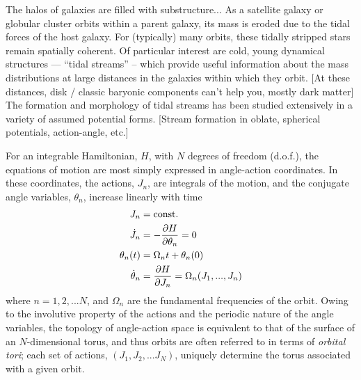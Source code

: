 \documentclass[letterpaper,12pt,preprint]{aastex}
\begin{document}
The halos of galaxies are filled with substructure...
As a satellite galaxy or globular cluster orbits within a parent galaxy, its mass is eroded due to the tidal forces of the host galaxy. For (typically) many orbits, these tidally stripped stars remain spatially coherent.
Of particular interest are cold, young dynamical structures --- ``tidal streams'' -- which provide useful information about the mass distributions at large distances in the galaxies within which they orbit. [At these distances, disk / classic baryonic components can't help you, mostly dark matter]
The formation and morphology of tidal streams has been studied extensively in a variety of assumed potential forms. [Stream formation in oblate, spherical potentials, action-angle, etc.]

For an integrable Hamiltonian, $H$, with $N$ degrees of freedom (d.o.f.), the equations of motion are most simply expressed in angle-action coordinates. In these coordinates, the actions, $J_n$, are integrals of the motion, and the conjugate angle variables, $\theta_n$, increase linearly with time
\begin{align}
	J_n &= {\rm const.}\\
	\dot{J}_n &= -\frac{\partial H}{\partial \theta_n} = 0\\
	\theta_n(t) &= \Omega_n t + \theta_n(0)\\
	\dot{\theta}_n &= \frac{\partial H}{\partial J_n} = \Omega_n(J_1,...,J_n)
\end{align}
where $n=1,2,...N$, and $\Omega_n$ are the fundamental frequencies of the orbit. Owing to the involutive property of the actions and the periodic nature of the angle variables, the topology of angle-action space is equivalent to that of the surface of an $N$-dimensional torus, and thus orbits are often referred to in terms of \emph{orbital tori}; each set of actions, $(J_1,J_2,...J_N)$, uniquely determine the torus associated with a given orbit.
\end{document}
